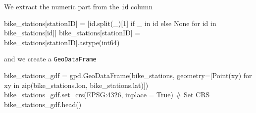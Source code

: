 \documentclass[
  letterpaper,
  DIV=11,
  numbers=noendperiod]{scrreprt}
\newenvironment{Shaded}{\begin{snugshade}}{\end{snugshade}}
\newcommand{\BuiltInTok}[1]{\textcolor[rgb]{0.00,0.23,0.31}{#1}}
\newcommand{\CommentTok}[1]{\textcolor[rgb]{0.37,0.37,0.37}{#1}}
\newcommand{\ControlFlowTok}[1]{\textcolor[rgb]{0.00,0.23,0.31}{#1}}
\newcommand{\DecValTok}[1]{\textcolor[rgb]{0.68,0.00,0.00}{#1}}
\newcommand{\KeywordTok}[1]{\textcolor[rgb]{0.00,0.23,0.31}{#1}}
\newcommand{\NormalTok}[1]{\textcolor[rgb]{0.00,0.23,0.31}{#1}}
\newcommand{\OperatorTok}[1]{\textcolor[rgb]{0.37,0.37,0.37}{#1}}
\newcommand{\StringTok}[1]{\textcolor[rgb]{0.13,0.47,0.30}{#1}}
\newcommand{\VariableTok}[1]{\textcolor[rgb]{0.07,0.07,0.07}{#1}}
\begin{document}
We extract the numeric part from the \texttt{id} column

\begin{Shaded}
\begin{Highlighting}[]
\NormalTok{bike\_stations[}\StringTok{\textquotesingle{}stationID\textquotesingle{}}\NormalTok{] }\OperatorTok{=}\NormalTok{ [}\BuiltInTok{id}\NormalTok{.split(}\StringTok{\textquotesingle{}\_\textquotesingle{}}\NormalTok{)[}\DecValTok{1}\NormalTok{] }\ControlFlowTok{if} \StringTok{\textquotesingle{}\_\textquotesingle{}} \KeywordTok{in} \BuiltInTok{id} \ControlFlowTok{else} \VariableTok{None} \ControlFlowTok{for} \BuiltInTok{id} \KeywordTok{in}\NormalTok{ bike\_stations[}\StringTok{\textquotesingle{}id\textquotesingle{}}\NormalTok{]]}
\NormalTok{bike\_stations[}\StringTok{\textquotesingle{}stationID\textquotesingle{}}\NormalTok{] }\OperatorTok{=}\NormalTok{ bike\_stations[}\StringTok{\textquotesingle{}stationID\textquotesingle{}}\NormalTok{].astype(}\StringTok{\textquotesingle{}int64\textquotesingle{}}\NormalTok{)}
\end{Highlighting}
\end{Shaded}

and we create a \texttt{GeoDataFrame}

\begin{Shaded}
\begin{Highlighting}[]
\NormalTok{bike\_stations\_gdf }\OperatorTok{=}\NormalTok{ gpd.GeoDataFrame(bike\_stations, geometry}\OperatorTok{=}\NormalTok{[Point(xy) }\ControlFlowTok{for}\NormalTok{ xy }\KeywordTok{in} \BuiltInTok{zip}\NormalTok{(bike\_stations.lon, bike\_stations.lat)])}
\NormalTok{bike\_stations\_gdf.set\_crs(}\StringTok{\textquotesingle{}EPSG:4326\textquotesingle{}}\NormalTok{, inplace }\OperatorTok{=} \VariableTok{True}\NormalTok{)  }\CommentTok{\# Set CRS}
\NormalTok{bike\_stations\_gdf.head()}
\end{Highlighting}
\end{Shaded}
\end{document}
